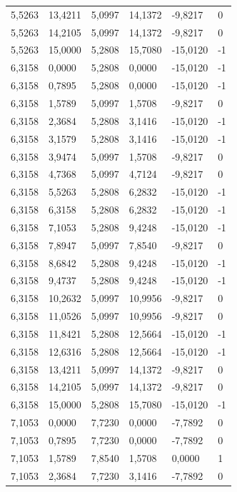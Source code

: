 \documentclass[12pt]{article}
\begin{document}
\begin{longtable}{@{}llllll@{}}
		5,5263  & 13,4211 & 5,0997  & 14,1372 & -9,8217  & 0  \\
		5,5263  & 14,2105 & 5,0997  & 14,1372 & -9,8217  & 0  \\
		5,5263  & 15,0000 & 5,2808  & 15,7080 & -15,0120 & -1 \\
		6,3158  & 0,0000  & 5,2808  & 0,0000  & -15,0120 & -1 \\
		6,3158  & 0,7895  & 5,2808  & 0,0000  & -15,0120 & -1 \\
		6,3158  & 1,5789  & 5,0997  & 1,5708  & -9,8217  & 0  \\
		6,3158  & 2,3684  & 5,2808  & 3,1416  & -15,0120 & -1 \\
		6,3158  & 3,1579  & 5,2808  & 3,1416  & -15,0120 & -1 \\
		6,3158  & 3,9474  & 5,0997  & 1,5708  & -9,8217  & 0  \\
		6,3158  & 4,7368  & 5,0997  & 4,7124  & -9,8217  & 0  \\
		6,3158  & 5,5263  & 5,2808  & 6,2832  & -15,0120 & -1 \\
		6,3158  & 6,3158  & 5,2808  & 6,2832  & -15,0120 & -1 \\
		6,3158  & 7,1053  & 5,2808  & 9,4248  & -15,0120 & -1 \\
		6,3158  & 7,8947  & 5,0997  & 7,8540  & -9,8217  & 0  \\
		6,3158  & 8,6842  & 5,2808  & 9,4248  & -15,0120 & -1 \\
		6,3158  & 9,4737  & 5,2808  & 9,4248  & -15,0120 & -1 \\
		6,3158  & 10,2632 & 5,0997  & 10,9956 & -9,8217  & 0  \\
		6,3158  & 11,0526 & 5,0997  & 10,9956 & -9,8217  & 0  \\
		6,3158  & 11,8421 & 5,2808  & 12,5664 & -15,0120 & -1 \\
		6,3158  & 12,6316 & 5,2808  & 12,5664 & -15,0120 & -1 \\
		6,3158  & 13,4211 & 5,0997  & 14,1372 & -9,8217  & 0  \\
		6,3158  & 14,2105 & 5,0997  & 14,1372 & -9,8217  & 0  \\
		6,3158  & 15,0000 & 5,2808  & 15,7080 & -15,0120 & -1 \\
		7,1053  & 0,0000  & 7,7230  & 0,0000  & -7,7892  & 0  \\
		7,1053  & 0,7895  & 7,7230  & 0,0000  & -7,7892  & 0  \\
		7,1053  & 1,5789  & 7,8540  & 1,5708  & 0,0000   & 1  \\
		7,1053  & 2,3684  & 7,7230  & 3,1416  & -7,7892  & 0  \\

\end{longtable}
\end{document}
